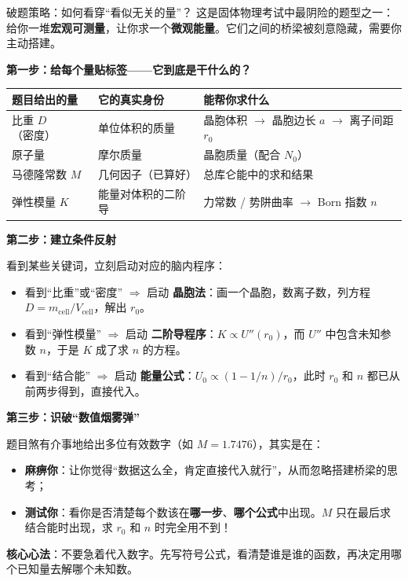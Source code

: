 \begin{insightbox}{破题策略：如何看穿``看似无关的量''？}
这是固体物理考试中最阴险的题型之一：给你一堆\textbf{宏观可测量}，让你求一个\textbf{微观能量}。它们之间的桥梁被刻意隐藏，需要你主动搭建。

\textbf{第一步：给每个量贴标签——它到底是干什么的？}

\begin{center}
\renewcommand{\arraystretch}{1.5}
\begin{tabular}{|l|l|l|}
\hline
\textbf{题目给出的量} & \textbf{它的真实身份} & \textbf{能帮你求什么} \\
\hline
比重 $D$（密度） & 单位体积的质量 & 晶胞体积 $\to$ 晶胞边长 $a$ $\to$ 离子间距 $r_0$ \\
原子量 & 摩尔质量 & 晶胞质量（配合 $N_0$） \\
马德隆常数 $M$ & 几何因子（已算好） & 总库仑能中的求和结果 \\
弹性模量 $K$ & 能量对体积的二阶导 & 力常数 / 势阱曲率 $\to$ Born 指数 $n$ \\
\hline
\end{tabular}
\end{center}

\textbf{第二步：建立条件反射}

看到某些关键词，立刻启动对应的脑内程序：
\begin{itemize}[nosep]
  \item 看到``比重''或``密度'' $\Rightarrow$ 启动 \textbf{晶胞法}：画一个晶胞，数离子数，列方程 $D = m_{\text{cell}}/V_{\text{cell}}$，解出 $r_0$。
  \item 看到``弹性模量'' $\Rightarrow$ 启动 \textbf{二阶导程序}：$K \propto U''(r_0)$，而 $U''$ 中包含未知参数 $n$，于是 $K$ 成了求 $n$ 的方程。
  \item 看到``结合能'' $\Rightarrow$ 启动 \textbf{能量公式}：$U_0 \propto (1 - 1/n)/r_0$，此时 $r_0$ 和 $n$ 都已从前两步得到，直接代入。
\end{itemize}

\textbf{第三步：识破``数值烟雾弹''}

题目煞有介事地给出多位有效数字（如 $M = 1.7476$），其实是在：
\begin{itemize}[nosep]
  \item \textbf{麻痹你}：让你觉得``数据这么全，肯定直接代入就行''，从而忽略搭建桥梁的思考；
  \item \textbf{测试你}：看你是否清楚每个数该在\textbf{哪一步}、\textbf{哪个公式}中出现。$M$ 只在最后求结合能时出现，求 $r_0$ 和 $n$ 时完全用不到！
\end{itemize}

\textbf{核心心法}：不要急着代入数字。先写符号公式，看清楚谁是谁的函数，再决定用哪个已知量去解哪个未知数。
\end{insightbox}

